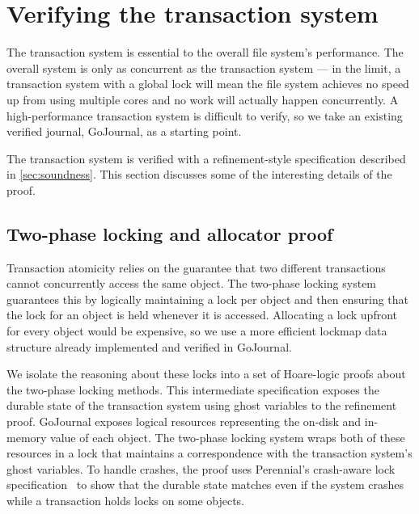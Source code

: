 \section{Verifying the transaction system}
\label{sec:txn-proof}


The transaction system is essential to the overall file system's performance.
The overall system is only as concurrent as the transaction
system --- in the limit, a transaction system with a global lock will mean the
file system achieves no speed up from using multiple cores and no work will
actually happen concurrently. A high-performance transaction system is difficult
to verify, so we take an existing verified journal, GoJournal, as a starting
point.

The transaction system is verified with a refinement-style specification
described in \autoref{sec:soundness}. This section discusses some of the
interesting details of the proof.

\subsection{Two-phase locking and allocator proof}

Transaction atomicity relies on the guarantee that two different transactions
cannot concurrently access the same object. The two-phase locking system
guarantees this by logically maintaining a lock per object and then ensuring
that the lock for an object is held whenever it is accessed. Allocating a lock
upfront for every object would be expensive, so we use a more efficient lockmap
data structure already implemented and verified in GoJournal.

We isolate the reasoning about these locks into a set of Hoare-logic proofs
about the two-phase locking methods. This intermediate specification exposes the
durable state of the transaction system using ghost variables to the refinement
proof. GoJournal exposes logical resources representing the on-disk and
in-memory value of each object. The two-phase locking system wraps both of these
resources in a lock that maintains a correspondence with the transaction
system's ghost variables. To handle crashes, the proof uses Perennial's
crash-aware lock specification~\citep{chajed:gojournal} to show that the durable
state matches even if the system crashes while a transaction holds locks on some
objects.


